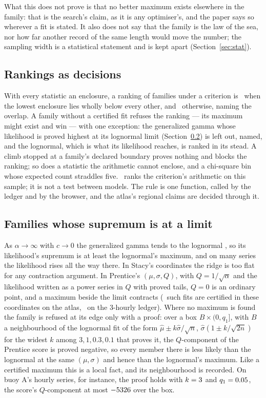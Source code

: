 \documentclass[preprint,11pt,authoryear]{elsarticle}
\begin{document}
What this does not prove is that no better maximum exists elsewhere in the family: that is the search's claim, as it is any optimiser's, and the paper says so wherever a fit is stated. It also does not say that the family is the law of the sea, nor how far another record of the same length would move the number; the sampling width is a statistical statement and is kept apart (Section~\ref{sec:stat}).

\subsection{Rankings as decisions}\label{sec:rank}
With every statistic an enclosure, a ranking of families under a criterion is \vDecided\ when the lowest enclosure lies wholly below every other, and \vRefused\ otherwise, naming the overlap. A family without a certified fit refuses the ranking --- its maximum might exist and win --- with one exception: the generalized gamma whose likelihood is proved highest at its lognormal limit (Section~\ref{sec:limits}) is left out, named, and the lognormal, which is what its likelihood reaches, is ranked in its stead. A climb stopped at a family's declared boundary proves nothing and blocks the ranking; so does a statistic the arithmetic cannot enclose, and a chi-square bin whose expected count straddles five. \vDecided\ ranks the criterion's arithmetic on this sample; it is not a test between models. The rule is one function, called by the ledger and by the browser, and the atlas's regional claims are decided through it.

\subsection{Families whose supremum is at a limit}\label{sec:limits}
As $\alpha \to \infty$ with $c \to 0$ the generalized gamma tends to the lognormal \citep{prentice1974}, so its likelihood's supremum is at least the lognormal's maximum, and on many series the likelihood rises all the way there. In Stacy's coordinates the ridge is too flat for any contraction argument. In Prentice's $(\mu, \sigma, Q)$, with $Q = 1/\sqrt{\alpha}$ and the likelihood written as a power series in $Q$ with proved tails, $Q = 0$ is an ordinary point, and a maximum beside the limit contracts (\APrentice\ such fits are certified in these coordinates on the atlas, \RPrentice\ on the 3-hourly ledger). Where no maximum is found the family is refused at its edge only with a proof: over a box $B \times (0, q_1]$, with $B$ a neighbourhood of the lognormal fit of the form $\hat\mu \pm k\hat\sigma/\sqrt n$, $\hat\sigma(1 \pm k/\sqrt{2n})$ for the widest $k$ among $3, 1, 0.3, 0.1$ that proves it, the $Q$-component of the Prentice score is proved negative, so every member there is less likely than the lognormal at the same $(\mu, \sigma)$ and hence than the lognormal's maximum. Like a certified maximum this is a local fact, and its neighbourhood is recorded. On buoy A's hourly series, for instance, the proof holds with $k = 3$ and $q_1 = 0.05$, the score's $Q$-component at most $-5326$ over the box.
\end{document}
